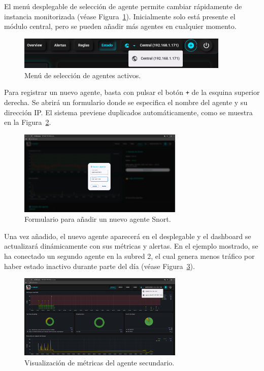 \documentclass[11pt,a4paper,twoside]{report}
\begin{document}
El menú desplegable de selección de agente permite cambiar rápidamente de instancia monitorizada (véase Figura~\ref{fig:selector-agentes}). Inicialmente solo está presente el módulo central, pero se pueden añadir más agentes en cualquier momento.

\begin{figure}[H]
	\centering
	\includegraphics[width=0.9\textwidth]{configuracion/7.png}
	\caption{Menú de selección de agentes activos.}
	\label{fig:selector-agentes}
\end{figure}

Para registrar un nuevo agente, basta con pulsar el botón \texttt{+} de la esquina superior derecha. Se abrirá un formulario donde se especifica el nombre del agente y su dirección IP. El sistema previene duplicados automáticamente, como se muestra en la Figura~\ref{fig:agregar-agente}.

\begin{figure}[H]
	\centering
	\includegraphics[width=0.7\textwidth]{configuracion/8.png}
	\caption{Formulario para añadir un nuevo agente Snort.}
	\label{fig:agregar-agente}
\end{figure}

Una vez añadido, el nuevo agente aparecerá en el desplegable y el dashboard se actualizará dinámicamente con sus métricas y alertas. En el ejemplo mostrado, se ha conectado un segundo agente en la subred 2, el cual genera menos tráfico por haber estado inactivo durante parte del día (véase Figura~\ref{fig:dashboard-agente-secundario}).

\begin{figure}[H]
	\centering
	\includegraphics[width=0.7\textwidth]{configuracion/9.png}
	\caption{Visualización de métricas del agente secundario.}
	\label{fig:dashboard-agente-secundario}
\end{figure}
\end{document}
